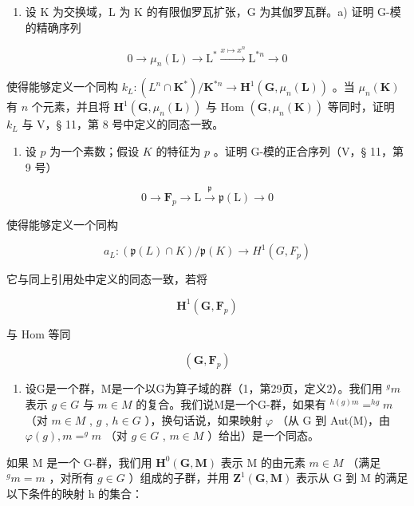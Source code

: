 \begin{enumerate}
\def\labelenumi{\arabic{enumi})}
\setcounter{enumi}{21}
\tightlist
\item
  设 K 为交换域，L 为 K 的有限伽罗瓦扩张，G 为其伽罗瓦群。a) 证明 G-模的精确序列
\end{enumerate}

\[
0 \rightarrow \mu_ {n} (\mathrm{L}) \rightarrow \mathrm{L} ^ {*} \xrightarrow {x \mapsto x ^ {n}} \mathrm{L} ^ {* n} \rightarrow 0
\]

使得能够定义一个同构 \(k_{L}:(L^{n}\cap\mathbf{K}^{*})/\mathbf{K}^{*n}\to\mathbf{H}^{1}(\mathbf{G},\mu_{n}(\mathbf{L}))\) 。当 \(\mu_{n}(\mathbf{K})\) 有 \(n\) 个元素，并且将 \(\mathbf{H}^{1}(\mathbf{G},\mu_{n}(\mathbf{L}))\) 与 Hom \((\mathbf{G},\mu_{n}(\mathbf{K}))\) 等同时，证明 \(k_{L}\) 与 V，§ 11，第 8 号中定义的同态一致。

\begin{enumerate}
\def\labelenumi{\alph{enumi})}
\setcounter{enumi}{1}
\tightlist
\item
  设 \(p\) 为一个素数；假设 \(K\) 的特征为 \(p\) 。证明 G-模的正合序列（V，§ 11，第 9 号）
\end{enumerate}

\[
0 \to \mathbf {F} _ {p} \to \mathrm{L} \stackrel {{\mathfrak {p}}} {{\to}} \mathfrak {p} (\mathrm{L}) \to 0
\]

使得能够定义一个同构

\[
a _ {L}: (\mathfrak {p} (L) \cap K) / \mathfrak {p} (K) \rightarrow H ^ {1} (G, F _ {p})
\]

它与同上引用处中定义的同态一致，若将

\[
\mathbf {H} ^ {1} (\mathbf {G}, \mathbf {F} _ {p})
\]

与 Hom 等同

\[
(\mathbf {G}, \mathbf {F} _ {p})
\]

\begin{enumerate}
\def\labelenumi{\arabic{enumi})}
\setcounter{enumi}{22}
\tightlist
\item
  设G是一个群，M是一个以G为算子域的群（1，第29页，定义2）。我们用 \(^{g}m\) 表示 \(g \in G\) 与 \(m \in M\) 的复合。我们说M是一个G-群，如果有 \(^{h(g)m} = ^{hg}m\) （对 \(m \in M\) , \(g\) , \(h \in G\) ），换句话说，如果映射 \(\varphi\) （从 G 到 Aut(M)，由 \(\varphi(g), m = ^{g}m\) （对 \(g \in G\) , \(m \in M\) ）给出）是一个同态。
\end{enumerate}

如果 M 是一个 G-群，我们用 \(\mathbf{H}^{0}(\mathbf{G},\mathbf{M})\) 表示 M 的由元素 \(m\in M\) （满足 \(^{g}m=m\) ，对所有 \(g\in G\) ）组成的子群，并用 \(\mathbf{Z}^{1}(\mathbf{G},\mathbf{M})\) 表示从 G 到 M 的满足以下条件的映射 h 的集合：

